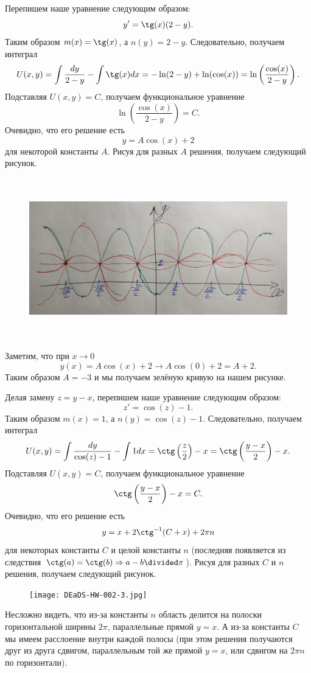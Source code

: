 \documentclass[12pt,a4paper]{article}
\begin{document}
    \begin{problem}{54}
        Перепишем наше уравнение следующим образом:
        \[y' = \tg(x) (2 - y).\]
        Таким образом $m(x) = \tg(x)$, а $n(y) = 2 - y$. Следовательно, получаем интеграл
        \[
            U(x, y)
            = \int \frac{dy}{2 - y} - \int \tg(x) dx
            = -\ln(2-y) + \ln(\cos(x))
            = \ln\left(\frac{\cos(x)}{2-y}\right).
        \]
        Подставляя $U(x, y) = C$, получаем функциональное уравнение
        \[\ln\left(\frac{\cos(x)}{2-y}\right) = C.\]
        Очевидно, что его решение есть
        \[y = A\cos(x) + 2\]
        для некоторой константы $A$. Рисуя для разных $A$ решения, получаем следующий рисунок.
        \begin{figure}[H]
            \centering
            \includegraphics[height=7cm]{DEaDS-HW-002-2.jpg}
        \end{figure}

        Заметим, что при $x \to 0$
        \[y(x) = A\cos(x) + 2 \to A\cos(0) + 2 = A + 2.\]
        Таким образом $A = -3$ и мы получаем зелёную кривую на нашем рисунке.
    \end{problem}

    \begin{problem}{62}
        Делая замену $z = y - x$, перепишем наше уравнение следующим образом:
        \[z' = \cos(z) - 1.\]
        Таким образом $m(x) = 1$, а $n(y) = \cos(z) - 1$. Следовательно, получаем интеграл
        \[
            U(x, y)
            = \int \frac{dy}{\cos(z) - 1} - \int 1 dx
            = \ctg\left(\frac{z}{2}\right) - x
            = \ctg\left(\frac{y - x}{2}\right) - x.
        \]
        Подставляя $U(x, y) = C$, получаем функциональное уравнение
        \[\ctg\left(\frac{y - x}{2}\right) - x = C.\]
        Очевидно, что его решение есть
        \[y = x + 2\ctg^{-1}(C + x) + 2\pi n\]
        для некоторых константы $C$ и целой константы $n$ (последняя появляется из следствия $\ctg(a) = \ctg(b) \Rightarrow a - b \divided \pi$). Рисуя для разных $C$ и $n$ решения, получаем следующий рисунок.
        \begin{figure}[H]
            \centering
            \texttt{[image: DEaDS-HW-002-3.jpg]}
        \end{figure}
        Несложно видеть, что из-за константы $n$ область делится на полоски горизонтальной ширины $2\pi$, параллельные прямой $y = x$. А из-за константы $C$ мы имеем расслоение внутри каждой полосы (при этом решения получаются друг из друга сдвигом, параллельным той же прямой $y = x$, или сдвигом на $2\pi n$ по горизонтали).
    \end{problem}
\end{document}

